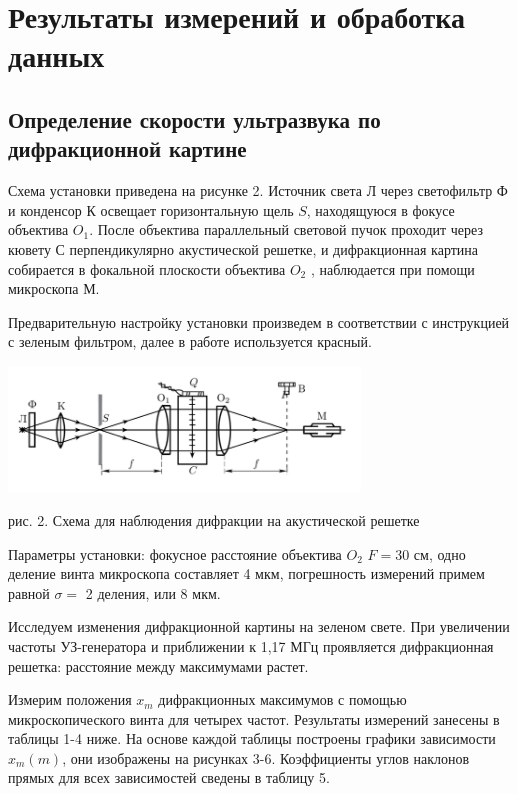 \documentclass[a4paper,12pt]{article}
\begin{document}
\section{Результаты измерений и обработка данных}

\subsection{Определение скорости ультразвука по дифракционной картине}

Схема установки приведена на рисунке 2. Источник света Л через светофильтр Ф и конденсор К освещает горизонтальную щель $ S $, находящуюся в фокусе объектива $ O_1 $. После объектива параллельный световой пучок проходит через кювету С перпендикулярно акустической решетке, и дифракционная картина собирается в фокальной плоскости объектива $ O_2 $ , наблюдается при помощи микроскопа М.

Предварительную настройку установки произведем в соответствии с инструкцией с зеленым фильтром, далее в работе используется красный.

\begin{center}
\includegraphics[width=0.7\textwidth]{2.png}

рис. 2. Схема для наблюдения дифракции на акустической решетке
\label{shema1}
\end{center}

Параметры установки: фокусное расстояние объектива $  O_2  $ $ F = 30 $ см, одно деление винта микроскопа составляет 4 мкм, погрешность измерений примем равной  $ \sigma = $ 2 деления, или 8 мкм.

Исследуем изменения дифракционной картины на зеленом свете. При увеличении частоты УЗ-генератора и приближении к 1,17 МГц проявляется дифракционная решетка: расстояние между максимумами растет.

Измерим положения $ x_m $ дифракционных максимумов с помощью микроскопического винта для четырех частот. Результаты измерений занесены в таблицы 1-4 ниже. На основе каждой таблицы построены графики зависимости $ x_m (m) $, они изображены на рисунках 3-6. Коэффициенты углов наклонов прямых для всех зависимостей сведены в таблицу 5. 
\end{document}
